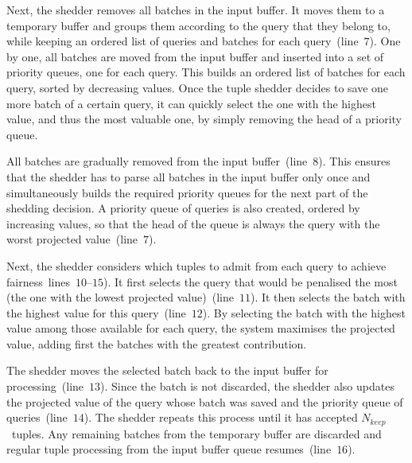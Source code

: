 Next, the shedder removes all batches in the input buffer. It moves them to a temporary 
buffer and groups them according to the query that they belong to, while keeping an ordered list of
queries and batches for each query~(line~$7$).
One by one, all batches are moved from the input buffer and inserted into a set of priority
queues, one for each query. This builds an ordered list of batches for each query, sorted by decreasing
\sic values. Once the tuple shedder decides to save one more batch of a certain
query, it can quickly select the one with the highest \sic value, and thus the most valuable one, by
simply removing the head of a priority queue.

All batches are gradually removed from the input buffer~(line~$8$). 
This ensures that the shedder has to parse all batches in the input buffer only once 
and simultaneously builds the required priority queues for the next part of the shedding decision. 
A priority queue of queries is also created, ordered by increasing \sic values, so that the head of the
queue is always the query with the worst projected \sic value~(line~$7$).

Next, the shedder considers which tuples to admit from each query to achieve fairness~lines~$10$--$15$). 
It first selects the query that would be penalised the most (\ie the one with the
lowest projected \sic value)~(line~$11$). It then selects the
batch with the highest \sic value for this query~(line~$12$).
By selecting the batch with the highest \sic value among those available for each query, the
system maximises the projected \sic value, adding first the batches with the greatest contribution.

The shedder moves the selected batch back to the input buffer for processing~(line~$13$). 
Since the batch is not discarded, the shedder also updates the projected \sic value of the query
whose batch was saved and the priority queue of queries~(line~$14$).
The shedder repeats this process until it has accepted $N_{keep}$~tuples.
Any remaining batches from the temporary buffer are discarded and regular tuple processing
from the input buffer queue resumes~(line~$16$). 
 
% 
% 

